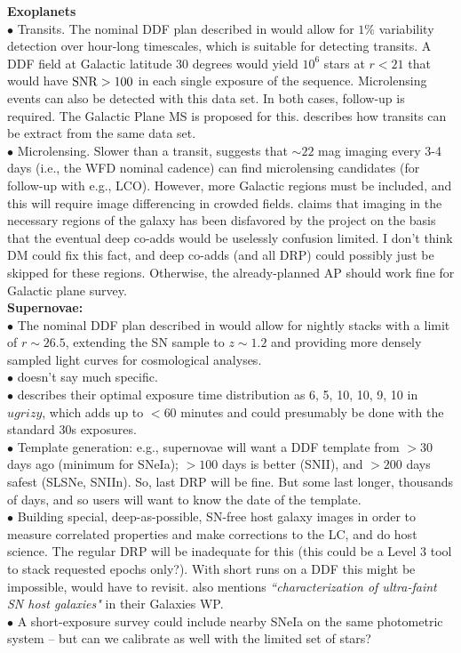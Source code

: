 \documentclass[DM,lsstdraft,toc]{lsstdoc}
\begin{document}
\noindent \textbf{Exoplanets} \\ 
$\bullet$ Transits. The nominal DDF plan described in \cite{2008arXiv0805.2366I} would allow for $1\%$ variability detection over hour-long timescales, which is suitable for detecting transits. A DDF field at Galactic latitude $30$ degrees would yield $10^6$ stars at $r<21$ that would have ${\rm SNR}>100$ in each single exposure of the sequence. Microlensing events can also be detected with this data set. In both cases, follow-up is required. The Galactic Plane MS is proposed for this. \cite{2013arXiv1304.3455G} describes how transits can be extract from the same data set.\\
$\bullet$ Microlensing. Slower than a transit, \cite{2013arXiv1304.3455G} suggests that $\sim22$ mag imaging every 3-4 days (i.e., the WFD nominal cadence) can find microlensing candidates (for follow-up with e.g., LCO). However, more Galactic regions must be included, and this will require image differencing in crowded fields. \cite{2013arXiv1304.3455G} claims that imaging in the necessary regions of the galaxy has been disfavored by the project on the basis that the eventual deep co-adds would be uselessly confusion limited. I don't think DM could fix this fact, and deep co-adds (and all DRP) could possibly just be skipped for these regions. Otherwise, the already-planned AP should work fine for Galactic plane survey.\\

\noindent \textbf{Supernovae:} \\
$\bullet$ The nominal DDF plan described in \cite{2008arXiv0805.2366I} would allow for nightly stacks with a limit of $r\sim26.5$, extending the SN sample to $z\sim1.2$ and providing more densely sampled light curves for cosmological analyses. \\
$\bullet$ \cite{CrottsWP} doesn't say much specific. \\
$\bullet$ \cite{KesslerWP} describes their optimal exposure time distribution as 6, 5, 10, 10, 9, 10 in $ugrizy$, which adds up to $<60$ minutes and could presumably be done with the standard 30s exposures. \\
$\bullet$ Template generation: e.g., supernovae will want a DDF template from $>30$ days ago (minimum for SNeIa); $>100$ days is better (SNII), and $>200$ days safest (SLSNe, SNIIn). So, last DRP will be fine. But some last longer, thousands of days, and so users will want to know the date of the template. \\
$\bullet$ Building special, deep-as-possible, SN-free host galaxy images in order to measure correlated properties and make corrections to the LC, and do host science. The regular DRP will be inadequate for this (this could be a Level 3 tool to stack requested epochs only?). With short runs on a DDF this might be impossible, would have to revisit.  \cite{FergusonWP} also mentions {\it ``characterization of ultra-faint SN host galaxies"} in their Galaxies WP. \\
$\bullet$ A short-exposure survey could include nearby SNeIa on the same photometric system -- but can we calibrate as well with the limited set of stars? \\
\end{document}
